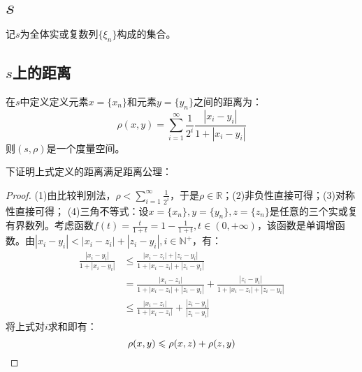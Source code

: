 \section{$s$}

记$s$为全体实或复数列$\{\xi_n\}$构成的集合。

\subsection{$s$上的距离}
\begin{definition}
	在$s$中定义定义元素$x=\{x_n\}$和元素$y=\{y_n\}$之间的距离为：
	\begin{equation*}
		\rho(x,y)=\sum_{i=1}^\infty\frac{1}{2^i}\frac{|x_i-y_i|}{1+|x_i-y_i|}
	\end{equation*}
	则$(s,\rho)$是一个度量空间。
\end{definition}
下证明上式定义的距离满足距离公理：
\begin{proof}
	(1)由比较判别法，$\rho<\sum\limits_{i=1}^\infty\frac{1}{2^i}$，于是$\rho\in\mathbb{R}$；(2)非负性直接可得；(3)对称性直接可得；
	(4)三角不等式：设$x=\{x_n\},y=\{y_n\},z=\{z_n\}$是任意的三个实或复有界数列。考虑函数$f(t)=\frac{t}{1+t}=1-\frac{1}{1+t},t\in(0,+\infty)$，该函数是单调增函数。由$|x_i-y_i|<|x_i-z_i|+|z_i-y_i|,i\in\mathbb{N}^+$，有：
	\begin{align*}
		\frac{|x_i-y_i|}{1+|x_i-y_i|}&\leqslant\frac{|x_i-z_i|+|z_i-y_i|}{1+|x_i-z_i|+|z_i-y_i|} \\
		&=\frac{|x_i-z_i|}{1+|x_i-z_i|+|z_i-y_i|}+\frac{|z_i-y_i|}{1+|x_i-z_i|+|z_i-y_i|} \\
		&\leqslant\frac{|x_i-z_i|}{1+|x_i-z_i|}+\frac{|z_i-y_i|}{|z_i-y_i|}
	\end{align*}
	将上式对$i$求和即有：
	\begin{equation*}
		\rho(x,y)\leqslant\rho(x,z)+\rho(z,y)\qedhere
	\end{equation*}
\end{proof}